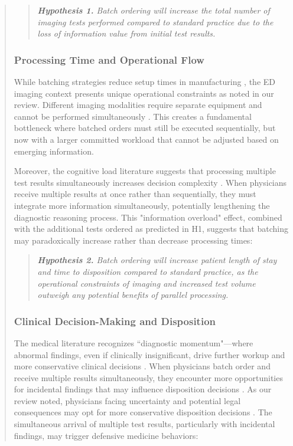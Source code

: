 \documentclass[11pt]{article}
\newcommand{\1}{\hbox{\rm 1\kern-.35em 1}}
\begin{document}
{{\begin{quote}
\begin{quote}
\small
\textit{\textbf{Hypothesis 1.} Batch ordering will increase the total number of imaging tests performed compared to standard practice due to the loss of information value from initial test results.}
\end{quote}

\subsubsection*{Processing Time and Operational Flow}

While batching strategies reduce setup times in manufacturing \cite{Fowler2022}, the ED imaging context presents unique operational constraints as noted in our review. Different imaging modalities require separate equipment and cannot be performed simultaneously \cite{Jessome2020}. This creates a fundamental bottleneck where batched orders must still be executed sequentially, but now with a larger committed workload that cannot be adjusted based on emerging information.

Moreover, the cognitive load literature suggests that processing multiple test results simultaneously increases decision complexity \cite{kc2013does}. When physicians receive multiple results at once rather than sequentially, they must integrate more information simultaneously, potentially lengthening the diagnostic reasoning process. This "information overload" effect, combined with the additional tests ordered as predicted in H1, suggests that batching may paradoxically increase rather than decrease processing times:

\begin{quote}
\small
\textit{\textbf{Hypothesis 2.} Batch ordering will increase patient length of stay and time to disposition compared to standard practice, as the operational constraints of imaging and increased test volume outweigh any potential benefits of parallel processing.}
\end{quote}

\subsubsection*{Clinical Decision-Making and Disposition}

The medical literature recognizes ``diagnostic momentum"---where abnormal findings, even if clinically insignificant, drive further workup and more conservative clinical decisions \cite{coen2022clinical, featherston2020decision}. When physicians batch order and receive multiple results simultaneously, they encounter more opportunities for incidental findings that may influence disposition decisions \cite{lumbreras2010incidental, berlin2011incidentaloma}. As our review noted, physicians facing uncertainty and potential legal consequences may opt for more conservative disposition decisions \cite{rao2012overuse, lam2020why}. The simultaneous arrival of multiple test results, particularly with incidental findings, may trigger defensive medicine behaviors:


\end{quote}}}
\end{document}
